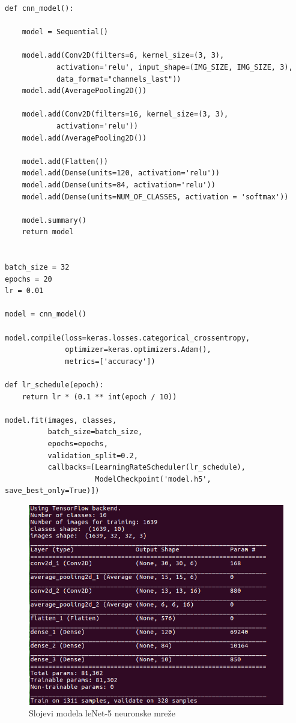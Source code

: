 \documentclass[a4paper]{article}
\begin{document}
\begin{lstlisting}[caption={LeNet-5},frame=single, label=code:leNet]
def cnn_model():
    
    model = Sequential()

    model.add(Conv2D(filters=6, kernel_size=(3, 3), 
    		activation='relu', input_shape=(IMG_SIZE, IMG_SIZE, 3),
    		data_format="channels_last"))
    model.add(AveragePooling2D())

    model.add(Conv2D(filters=16, kernel_size=(3, 3), 
    		activation='relu'))
    model.add(AveragePooling2D())

    model.add(Flatten())
    model.add(Dense(units=120, activation='relu'))
    model.add(Dense(units=84, activation='relu'))
    model.add(Dense(units=NUM_OF_CLASSES, activation = 'softmax'))
    
    model.summary()
    return model


batch_size = 32   
epochs = 20
lr = 0.01         

model = cnn_model()

model.compile(loss=keras.losses.categorical_crossentropy, 
			  optimizer=keras.optimizers.Adam(),
			  metrics=['accuracy'])

def lr_schedule(epoch):
    return lr * (0.1 ** int(epoch / 10))

model.fit(images, classes,
          batch_size=batch_size,
          epochs=epochs,
          validation_split=0.2,
          callbacks=[LearningRateScheduler(lr_schedule), 
          			 ModelCheckpoint('model.h5', save_best_only=True)])
\end{lstlisting}


\begin{figure}[h!]
\begin{center}
\includegraphics[scale=0.45]{leNet_arhitektura.png}
\end{center}
\caption{Slojevi modela leNet-5 neuronske mreže}
\label{fig:leNet_arh}
\end{figure}
\end{document}
